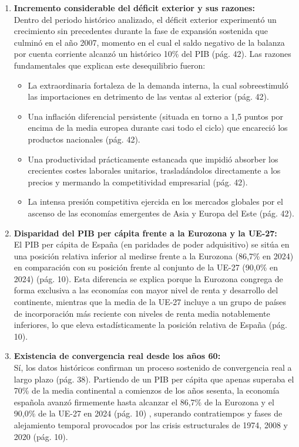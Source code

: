 \begin{enumerate}[label=\arabic*.]
    \item \textbf{Incremento considerable del déficit exterior y sus razones:} \\
    Dentro del periodo histórico analizado, el déficit exterior experimentó un crecimiento sin precedentes durante la fase de expansión sostenida que culminó en el año 2007, momento en el cual el saldo negativo de la balanza por cuenta corriente alcanzó un histórico 10\% del PIB (pág. 42). Las razones fundamentales que explican este desequilibrio fueron:
    \begin{itemize}
        \item La extraordinaria fortaleza de la demanda interna, la cual sobreestimuló las importaciones en detrimento de las ventas al exterior (pág. 42).
        \item Una inflación diferencial persistente (situada en torno a 1,5 puntos por encima de la media europea durante casi todo el ciclo) que encareció los productos nacionales (pág. 42).
        \item Una productividad prácticamente estancada que impidió absorber los crecientes costes laborales unitarios, trasladándolos directamente a los precios y mermando la competitividad empresarial (pág. 42).
        \item La intensa presión competitiva ejercida en los mercados globales por el ascenso de las economías emergentes de Asia y Europa del Este (pág. 42).
    \end{itemize}

    \item \textbf{Disparidad del PIB per cápita frente a la Eurozona y la UE-27:} \\
    El PIB per cápita de España (en paridades de poder adquisitivo) se sitúa en una posición relativa inferior al medirse frente a la Eurozona (86,7\% en 2024) en comparación con su posición frente al conjunto de la UE-27 (90,0\% en 2024) (pág. 10). Esta diferencia se explica porque la Eurozona congrega de forma exclusiva a las economías con mayor nivel de renta y desarrollo del continente, mientras que la media de la UE-27 incluye a un grupo de países de incorporación más reciente con niveles de renta media notablemente inferiores, lo que eleva estadísticamente la posición relativa de España (pág. 10).

    \item \textbf{Existencia de convergencia real desde los años 60:} \\
    Sí, los datos históricos confirman un proceso sostenido de convergencia real a largo plazo (pág. 38). Partiendo de un PIB per cápita que apenas superaba el 70\% de la media continental a comienzos de los años sesenta, la economía española avanzó firmemente hasta alcanzar el 86,7\% de la Eurozona y el 90,0\% de la UE-27 en 2024 (pág. 10) , superando contratiempos y fases de alejamiento temporal provocados por las crisis estructurales de 1974, 2008 y 2020 (pág. 10).


\end{enumerate}
